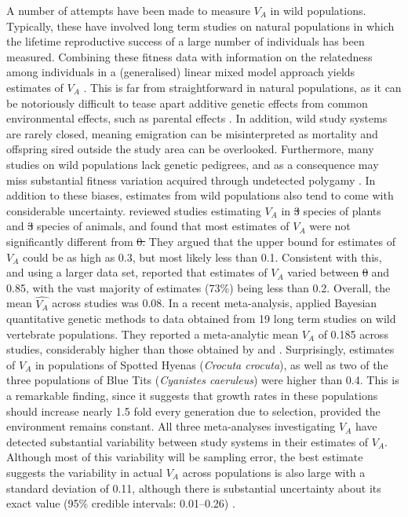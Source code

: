 \documentclass[12pt]{article}
\makeatletter
\providecommand{\DIFaddtex}[1]{{\protect\color{blue}\uwave{#1}}} %
\providecommand{\DIFdeltex}[1]{{\protect\color{red}\sout{#1}}} %
\providecommand{\DIFaddbegin}{} %
\providecommand{\DIFaddend}{} %
\providecommand{\DIFdelbegin}{} %
\providecommand{\DIFdelend}{} %
\providecommand{\DIFadd}[1]{\texorpdfstring{\DIFaddtex{#1}}{#1}} %
\providecommand{\DIFdel}[1]{\texorpdfstring{\DIFdeltex{#1}}{}} %
\newcommand{\DIFscaledelfig}{0.5}
\newlength{\DIFdelgraphicswidth} %
\newlength{\DIFdelgraphicsheight} %
\newcommand{\DIFaddincludegraphics}[2][]{{\color{blue}\fbox{\DIFOincludegraphics[#1]{#2}}}} %
\newcommand{\DIFdelincludegraphics}[2][]{%
\sbox{\DIFdelgraphicsbox}{\DIFOincludegraphics[#1]{#2}}%
\settoboxwidth{\DIFdelgraphicswidth}{\DIFdelgraphicsbox} %
\settoboxtotalheight{\DIFdelgraphicsheight}{\DIFdelgraphicsbox} %
\scalebox{\DIFscaledelfig}{%
\parbox[b]{\DIFdelgraphicswidth}{\usebox{\DIFdelgraphicsbox}\\[-\baselineskip] \rule{\DIFdelgraphicswidth}{0em}}\llap{\resizebox{\DIFdelgraphicswidth}{\DIFdelgraphicsheight}{%
\setlength{\unitlength}{\DIFdelgraphicswidth}%
\begin{picture}(1,1)%
\thicklines\linethickness{2pt} %
{\color[rgb]{1,0,0}\put(0,0){\framebox(1,1){}}}%
{\color[rgb]{1,0,0}\put(0,0){\line( 1,1){1}}}%
{\color[rgb]{1,0,0}\put(0,1){\line(1,-1){1}}}%
\end{picture}%
}\hspace*{3pt}}} %
} %
\DeclareRobustCommand{\DIFaddbegin}{\DIFOaddbegin \let\includegraphics\DIFaddincludegraphics} %
\DeclareRobustCommand{\DIFaddend}{\DIFOaddend \let\includegraphics\DIFOincludegraphics} %
\DeclareRobustCommand{\DIFdelbegin}{\DIFOdelbegin \let\includegraphics\DIFdelincludegraphics} %
\DeclareRobustCommand{\DIFdelend}{\DIFOaddend \let\includegraphics\DIFOincludegraphics} %
\let\sout@orig\sout %
\renewcommand{\sout}[1]{\ifmmode\text{\sout@orig{\ensuremath{#1}}}\else\sout@orig{#1}\fi} %
\makeatother
\begin{document}
\begin{bibunit}
A number of attempts have been made to measure $V_A$ in wild populations. Typically, these have involved long term studies on natural populations in which the lifetime reproductive success of a large number of individuals has been measured. Combining these fitness data with information on the relatedness among individuals in a (generalised) linear mixed model approach yields estimates of $V_A$ \citep{kruuk2004estimating}. This is far from straightforward in natural populations, as it can be notoriously difficult to tease apart additive genetic effects from common environmental effects, such as parental effects \citep{kruuk2007separate, shaw2014quantitative}. In addition, wild study systems are rarely closed, meaning emigration can be misinterpreted as mortality and offspring sired outside the study area can be overlooked. Furthermore, many studies on wild populations lack genetic pedigrees, and as a consequence may miss substantial fitness variation acquired through undetected polygamy \citep{vedder2011polygyny, charmantier2006testing}. In addition to these biases, estimates from wild populations also tend to come with considerable uncertainty. \citet{burt1995evolution} reviewed studies estimating $V_A$ in \DIFdelbegin \DIFdel{3 }\DIFdelend \DIFaddbegin \DIFadd{three }\DIFaddend species of plants and \DIFdelbegin \DIFdel{3 }\DIFdelend \DIFaddbegin \DIFadd{three }\DIFaddend species of animals, and found that most estimates of $V_A$ were not significantly different from \DIFdelbegin \DIFdel{0. }\DIFdelend \DIFaddbegin \DIFadd{zero. }\DIFaddend They argued that the upper bound for estimates of $V_A$ could be as high as 0.3, but most likely less than 0.1. Consistent with this, and using a larger data set, \citet{hendry2018contemporary} reported that estimates of $V_A$ varied between \DIFdelbegin \DIFdel{0 }\DIFdelend \DIFaddbegin \DIFadd{zero }\DIFaddend and 0.85, with the vast majority of estimates (73\%) being less than 0.2. Overall, the mean $\widehat{V_A}$ across studies was 0.08. In a recent meta-analysis, \citet{bonnet2022genetic} applied Bayesian quantitative genetic methods to data obtained from 19 long term studies on wild vertebrate populations. They reported a meta-analytic mean $V_A$ of 0.185 across studies, considerably higher than those obtained by \citet{burt1995evolution} and \citet{hendry2018contemporary}. Surprisingly, estimates of $V_A$ in populations of Spotted Hyenas (\emph{Crocuta crocuta}), as well as two of the three populations of Blue Tits (\emph{Cyanistes caeruleus}) were higher than 0.4. This is a remarkable finding, since it suggests that growth rates in these populations should increase nearly 1.5 fold every generation due to selection, provided the environment remains constant. All three meta-analyses investigating $V_A$ \citep{burt1995evolution,hendry2018contemporary,bonnet2022genetic} have detected substantial variability between study systems in their estimates of $V_A$. Although most of this variability will be sampling error, the best estimate suggests the variability in actual $V_A$ across populations is also large with a standard deviation of 0.11, although there is substantial uncertainty about its exact value (95\% credible intervals: 0.01--0.26) \citep{bonnet2022genetic}.  


\end{bibunit}
\end{document}
